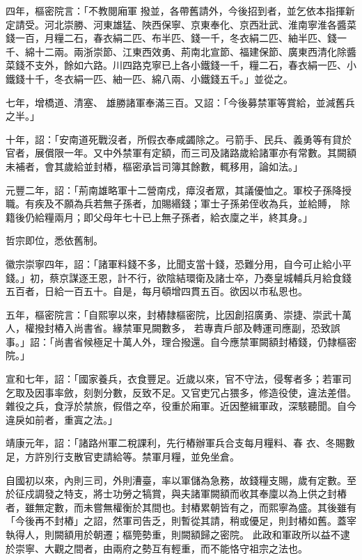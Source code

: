 \begin{pinyinscope}
 四年，樞密院言：「不教閱廂軍
 撥並，各帶舊請外，今後招到者，並乞依本指揮新定請受。河北崇勝、河東雄猛、陜西保寧、京東奉化、京西壯武、淮南寧淮各醬菜錢一百，月糧二石，春衣絹二匹、布半匹、錢一千，冬衣絹二匹、紬半匹、錢一千、綿十二兩。兩浙崇節、江東西效勇、荊南北宣節、福建保節、廣東西清化除醬菜錢不支外，餘如六路。川四路克寧已上各小鐵錢一千，糧二石，春衣絹一匹、小鐵錢十千，冬衣絹一匹、紬一匹、綿八兩、小鐵錢五千。」並從之。



 七年，增橋道、清塞、
 雄勝諸軍奉滿三百。又詔：「今後募禁軍等賞給，並減舊兵之半。」



 十年，詔：「安南道死戰沒者，所假衣奉咸蠲除之。弓箭手、民兵、義勇等有貸於官者，展償限一年。又中外禁軍有定額，而三司及諸路歲給諸軍亦有常數。其闕額未補者，會其歲給並封樁，樞密承旨司簿其餘數，輒移用，論如法。」



 元豐二年，詔：「荊南雄略軍十二營南戍，瘴沒者眾，其議優恤之。軍校子孫降授職。有疾及不願為兵若無子孫者，加賜緡錢；軍士子孫弟侄收為兵，並給賻，
 除籍後仍給糧兩月；即父母年七十已上無子孫者，給衣廩之半，終其身。」



 哲宗即位，悉依舊制。



 徽宗崇寧四年，詔：「諸軍料錢不多，比聞支當十錢，恐難分用，自今可止給小平錢。」初，蔡京謀逐王恩，計不行，欲陰結環衛及諸士卒，乃奏皇城輔兵月給食錢五百者，日給一百五十。自是，每月頓增四貫五百。欲因以市私恩也。



 五年，樞密院言：「自熙寧以來，封樁隸樞密院，比因創招廣勇、崇捷、崇武十萬人，權撥封樁入尚書省。緣禁軍見闕數多，
 若專責戶部及轉運司應副，恐致誤事。」詔：「尚書省候極足十萬人外，理合撥還。自今應禁軍闕額封樁錢，仍隸樞密院。」



 宣和七年，詔：「國家養兵，衣食豐足。近歲以來，官不守法，侵奪者多；若軍司乞取及因事率斂，刻剝分數，反致不足。又官吏冗占猥多，修造役使，違法差借。雜役之兵，食浮於禁旅，假借之卒，役重於廂軍。近因整緝軍政，深駭聽聞。自今違戾如前者，重寘之法。」



 靖康元年，詔：「諸路州軍二稅課利，先行樁辦軍兵合支每月糧料、春
 衣、冬賜數足，方許別行支散官吏請給等。禁軍月糧，並免坐倉。



 自國初以來，內則三司，外則漕臺，率以軍儲為急務，故錢糧支賜，歲有定數。至於征戍調發之特支，將士功勞之犒賞，與夫諸軍闕額而收其奉廩以為上供之封樁者，雖無定數，而未嘗無權衡於其間也。封樁累朝皆有之，而熙寧為盛。其後雖有「今後再不封樁」之詔，然軍司告乏，則暫從其請，稍或優足，則封樁如舊。蓋宰執得人，則闕額用於朝遷；樞筦勢重，則闕額歸之密院。
 此政和軍政所以益不逮於崇寧、大觀之間者，由兩府之勢互有輕重，而不能恪守祖宗之法也。




\end{pinyinscope}
